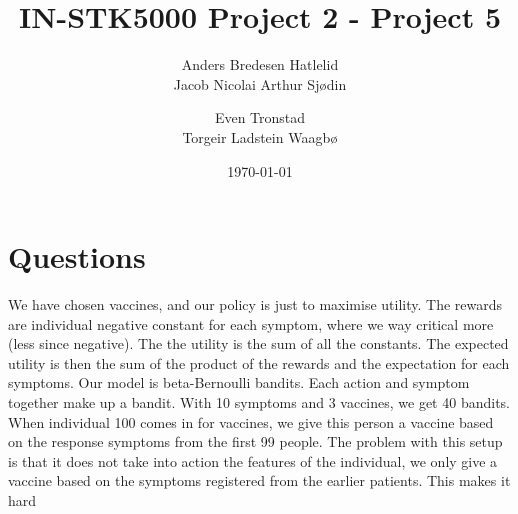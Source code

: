 \documentclass[a4paper, 12pt]{extarticle}
\title{IN-STK5000 Project 2 - Project 5}
\author{Anders Bredesen Hatlelid \\
        Jacob Nicolai Arthur Sjødin \\
        \and
        Even Tronstad \\
        Torgeir Ladstein Waagbø 
}
\date{\today}
\begin{document}
\maketitle
\section*{Questions}
\item We have chosen vaccines, and our policy is just to maximise utility. 
The rewards are individual negative constant for each symptom, where we way critical more (less since negative). 
The the utility is the sum of all the constants. The expected utility is then the sum of the product of the rewards and the expectation for each symptoms. 
Our model is beta-Bernoulli bandits. Each action and symptom together make up a bandit. With 10 symptoms and 3 vaccines, we get 40 bandits. 
When individual 100 comes in for vaccines, we give this person a vaccine based on the response symptoms from the first 99 people. 
The problem with this setup is that it does not take into action the features of the individual, we only give a vaccine based on the symptoms registered from the earlier patients. 
This makes it hard 
\end{document}
